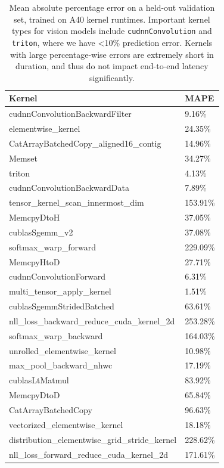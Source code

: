 \begin{table}[htbp]
\centering
\begin{tabular}{l l}
\toprule
\textbf{Kernel} & \textbf{MAPE}\\
\midrule
cudnnConvolutionBackwardFilter & 9.16\% \\
elementwise\_kernel & 24.35\% \\
CatArrayBatchedCopy\_aligned16\_contig & 14.96\% \\
Memset & 34.27\% \\
triton & 4.13\% \\
cudnnConvolutionBackwardData & 7.89\% \\
tensor\_kernel\_scan\_innermost\_dim & 153.91\% \\
MemcpyDtoH & 37.05\% \\
cublasSgemm\_v2 & 37.08\% \\
softmax\_warp\_forward & 229.09\% \\
MemcpyHtoD & 27.71\% \\
cudnnConvolutionForward & 6.31\% \\
multi\_tensor\_apply\_kernel & 1.51\% \\
cublasSgemmStridedBatched & 63.61\% \\
nll\_loss\_backward\_reduce\_cuda\_kernel\_2d & 253.28\% \\
softmax\_warp\_backward & 164.03\% \\
unrolled\_elementwise\_kernel & 10.98\% \\
max\_pool\_backward\_nhwc & 17.19\% \\
cublasLtMatmul & 83.92\% \\
MemcpyDtoD & 65.84\% \\
CatArrayBatchedCopy & 96.63\% \\
vectorized\_elementwise\_kernel & 18.18\% \\
distribution\_elementwise\_grid\_stride\_kernel & 228.62\% \\
nll\_loss\_forward\_reduce\_cuda\_kernel\_2d & 171.61\% \\
\bottomrule
\end{tabular}
\caption{Mean absolute percentage error on a held-out validation set, trained on A40 kernel runtimes. Important kernel types for vision models include \texttt{cudnnConvolution} and \texttt{triton}, where we have <10\% prediction error. Kernels with large percentage-wise errors are extremely short in duration, and thus do not impact end-to-end latency significantly.}
\label{tab:a40_kernel_accuracy}
\end{table}
